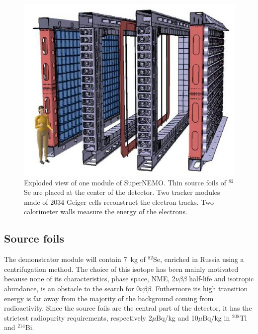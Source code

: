 \documentclass[main.tex]{subfiles}
\begin{document}
\begin{figure}[h!]
\begin{center}
\includegraphics[scale=0.65]{pictures/Chap3/snemomodule.png}
\caption{Exploded view of one module of SuperNEMO. Thin source foils of $^{\text{82}}$Se are placed at the center of the detector. Two tracker modules made of 2034 Geiger cells reconstruct the electron tracks. Two calorimeter walls measure the energy of the electrons.}
\label{SuperNEMOexplodedView}
\end{center}
\end{figure}


\FloatBarrier


\subsection{Source foils}\label{sec:SourceFoilsSN}


\NI The demonstrator module will contain 7~kg of $^{\text{82}}$Se, enriched in Russia using a centrifugation method. The choice of this isotope has been mainly motivated because none of its characteristics, phase space, NME, 2$\nu\beta\beta$ half-life and isotropic abundance, is an obstacle to the search for 0$\nu\beta\beta$. Futhermore its high transition energy is far away from the majority of the background coming from radioactivity.
Since the source foils are the central part of the detector, it has the strictest radiopurity requirements, respectively 2$\mu$Bq/kg and 10$\mu$Bq/kg in $^{\text{208}}$Tl and $^{\text{214}}$Bi.
\end{document}
